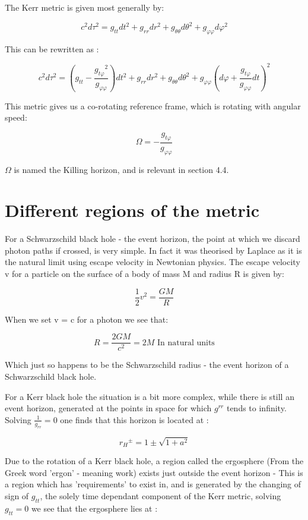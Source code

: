 \documentclass[oneside,openright,frontopenright]{dmathesis}
\begin{document}
	The Kerr metric is given most generally by:

	\[c^2d\tau^2 = g_{tt}dt^2+g_{rr}dr^2+g_{\theta\theta}d\theta^2+g_{\varphi\varphi}d\varphi^2\]

	This can be rewritten as \cite{kerrMetric}:

	\[c^2d\tau^2 = \left(g_{tt}-\frac{{g_{t\varphi}}^2}{g_{\varphi\varphi}}\right)dt^2+g_{rr}dr^2+g_{\theta\theta}d\theta^2+g_{\varphi\varphi}\left(d\varphi+\frac{g_{t\varphi}}{g_{\varphi\varphi}}dt\right)^2\]

	This metric gives us a co-rotating reference frame, which is rotating with angular speed:

	\[\Omega = -\frac{g_{t\varphi}}{g_{\varphi\varphi}}\]

	$\Omega$ is named the Killing horizon, and is relevant in section 4.4.

\section{Different regions of the metric}

	For a Schwarzschild black hole - the event horizon, the point at which we discard photon paths if crossed, is very simple. In fact it was theorised by Laplace as it is the natural limit using escape velocity in Newtonian physics. The escape velocity v for a particle on the surface of a body of mass M and radius R is given by:

	\[\frac{1}{2}v^2 = \frac{GM}{R}\]

	When we set v = c for a photon we see that:

	\[R = \frac{2GM}{c^2} = 2M \mbox{ In natural units}\]

	Which just so happens to be the Schwarzschild radius - the event horizon of a Schwarzschild black hole.

	For a Kerr black hole the situation is a bit more complex, while there is still an event horizon, generated at the points in space for which $g^{rr}$ tends to infinity. Solving $\frac{1}{g_{rr}} = 0$ one finds that this horizon is located at \cite{kerrMetric}:

	\[{r_{H}}^{\pm} = 1\pm\sqrt{1+a^2}\]

	Due to the rotation of a Kerr black hole, a region called the ergosphere (From the Greek word 'ergon' - meaning work) exists just outside the event horizon - This is a region which has 'requirements' to exist in, and is generated by the changing of sign of $g_{tt}$, the solely time dependant component of the Kerr metric, solving $g_{tt} = 0$ we see that the ergosphere lies at \cite{kerrMetric}:
\end{document}
